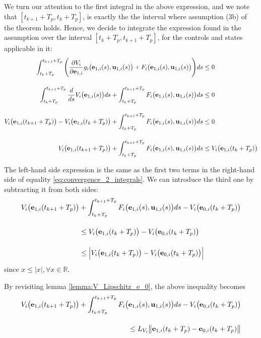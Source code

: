 \begin{gg_box}
  We turn our attention to the first integral in the above expression, and we
  note that $[t_{k+1} + T_p, t_k + T_p]$, is exactly the
  the interval where assumption (3b) of the theorem holds. Hence,
  we decide to integrate the expression found in the assumption over the
  interval $[t_k + T_p, t_{k+1} + T_p]$, for the controls and states applicable
  in it:
  \begin{align}
    \int_{t_k + T_p}^{t_{k+1} + T_p} \Bigg(\dfrac{\partial V_i}{\partial \bm{\mathbf{e}}_{1,i}} g_i\big(\bm{\mathbf{e}}_{1,i}(s), \bm{\mathbf{u}}_{1,i}(s)\big)
    + F_i\big(\bm{\mathbf{e}}_{1,i}(s), \bm{\mathbf{u}}_{1,i}(s)\big)\Bigg) ds &\leq 0 \\[2.5ex]
    \int_{t_k + T_p}^{t_{k+1} + T_p} \dfrac{d}{ds} V_i\big(\bm{\mathbf{e}}_{1,i}(s)\big) d s
    + \int_{t_k + T_p}^{t_{k+1} + T_p} F_i\big(\bm{\mathbf{e}}_{1,i}(s), \bm{\mathbf{u}}_{1,i}(s)\big) ds &\leq 0 \\[2.5ex]
    V_i\big(\bm{\mathbf{e}}_{1,i}(t_{k+1} + T_p)\big) - V_i\big(\bm{\mathbf{e}}_{1,i}(t_k + T_p)\big)
    + \int_{t_k + T_p}^{t_{k+1} + T_p} F_i\big(\bm{\mathbf{e}}_{1,i}(s), \bm{\mathbf{u}}_{1,i}(s)\big) ds &\leq 0 \\[2.5ex]
    V_i\big(\bm{\mathbf{e}}_{1,i}(t_{k+1} + T_p)\big)
    + \int_{t_k + T_p}^{t_{k+1} + T_p} F_i\big(\bm{\mathbf{e}}_{1,i}(s), \bm{\mathbf{u}}_{1,i}(s)\big) ds &\leq V_i\big(\bm{\mathbf{e}}_{1,i}(t_k + T_p)\big)
  \end{align}

  The left-hand side expression is the same as the first two terms in the
  right-hand side of equality \eqref{eq:convergence_2_integrals}. We can
  introduce the third one by subtracting it from both sides:
  \begin{align}
    V_i\big(\bm{\mathbf{e}}_{1,i}(t_{k+1} + T_p)\big)
    &+ \int_{t_k + T_p}^{t_{k+1} + T_p} F_i\big(\bm{\mathbf{e}}_{1,i}(s), \bm{\mathbf{u}}_{1,i}(s)\big) ds
    - V_i\big(\bm{\mathbf{e}}_{0,i}(t_k + T_p)\big) \\[2.5ex]
    &\leq V_i\big(\bm{\mathbf{e}}_{1,i}(t_k + T_p)\big)
    - V_i\big(\bm{\mathbf{e}}_{0,i}(t_k + T_p)\big) \\[2.5ex]
    &\leq \Big|V_i\big(\bm{\mathbf{e}}_{1,i}(t_k + T_p)\big)
    - V_i\big(\bm{\mathbf{e}}_{0,i}(t_k + T_p)\big)\Big|
  \end{align}
  since $x \leq |x|, \forall x \in \mathbb{R}$.

  By revisiting lemma \eqref{lemma:V_Lipschitz_e_0}, the above inequality
  becomes
  \begin{align}
    V_i\big(\bm{\mathbf{e}}_{1,i}(t_{k+1} + T_p)\big)
    + \int_{t_k + T_p}^{t_{k+1} + T_p} F_i\big(\bm{\mathbf{e}}_{1,i}(s), \bm{\mathbf{u}}_{1,i}(s)\big) ds
    - V_i\big(\bm{\mathbf{e}}_{0,i}(t_k + T_p)\big) \\[2.5ex]
    \leq L_{V_i} \big\|\bm{\mathbf{e}}_{1,i}(t_k + T_p) - \bm{\mathbf{e}}_{0,i}(t_k + T_p)\big\|
  \end{align}


\end{gg_box}
